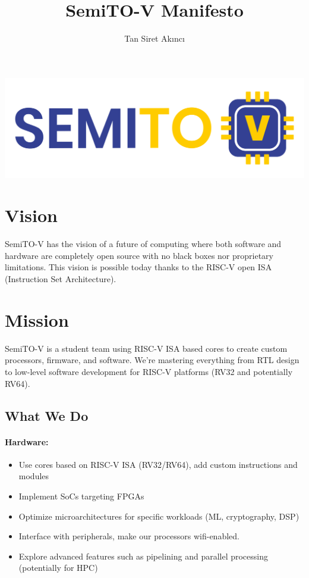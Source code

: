 \documentclass{article}
\title{SemiTO-V Manifesto}
\author{Tan Siret Akıncı}
\date
\begin{document}
\maketitle
\begin{center}
    \includegraphics[scale=0.7]{semito-v_logo.png}
\end{center}
\maketitle

\section{Vision}
SemiTO-V has the vision of a future of computing where both software and hardware are completely open source with no black boxes nor proprietary limitations. This vision is possible today thanks to the RISC-V open ISA (Instruction Set Architecture).

\section{Mission}
SemiTO-V is a student team using RISC-V ISA based cores to create custom processors, firmware, and software. We're mastering everything from RTL design to low-level software development for RISC-V platforms (RV32 and potentially RV64).

\subsection{What We Do}

\paragraph{Hardware:}

\begin{itemize}
    \item Use cores based on RISC-V ISA (RV32/RV64), add custom instructions and modules
    \item Implement SoCs targeting FPGAs
    \item Optimize microarchitectures for specific workloads (ML, cryptography, DSP)
    \item Interface with peripherals, make our processors wifi-enabled.
    \item Explore advanced features such as pipelining and parallel processing (potentially for HPC)
\end{itemize}
\end{document}
